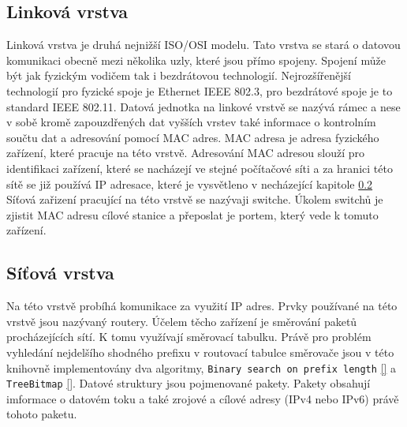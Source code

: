 \subsection{Linková vrstva}\label{layers:link}
Linková vrstva je druhá nejnižší ISO/OSI modelu. Tato vrstva se stará o datovou komunikaci
obecně mezi několika uzly, které jsou přímo spojeny. Spojení může být jak fyzickým vodičem tak i
bezdrátovou technologií. Nejrozšířenější technologií pro fyzické spoje je Ethernet IEEE 802.3, pro bezdrátové spoje
je to standard IEEE 802.11. Datová jednotka na linkové vrstvě se nazývá rámec a nese v sobě kromě
zapouzdřených dat vyšších vrstev také informace o kontrolním součtu dat a adresování pomocí MAC adres.
MAC adresa je adresa fyzického zařízení, které pracuje na této vrstvě.
Adresování MAC adresou slouží pro identifikaci zařízení, které se nacházejí ve stejné počítačové síti
a za hranici této sítě se již používá IP adresace, které je vysvětleno v necházející kapitole \ref{layers:network}
Síťová zařizení pracující na této vrstvě se nazývaji switche. Úkolem switchů je zjistit MAC adresu cílové stanice a přeposlat je portem, který vede k tomuto zařízení.

\subsection{Síťová vrstva}\label{layers:network}
Na této vrstvě probíhá komunikace za využití IP adres. Prvky používané na této vrstvě jsou nazývaný routery.
Účelem těcho zařízení je směrování paketů procházejících sítí. K tomu využívají směrovací tabulku.
Právě pro problém vyhledání nejdelšího shodného prefixu v routovací tabulce směrovače jsou v této knihovně
implementovány dva algoritmy, \texttt{Binary search on prefix length} \ref{} a \texttt{TreeBitmap} \ref{}.
Datové struktury jsou pojmenované pakety. Pakety obsahují imformace o datovém toku a také zrojové a cílové adresy (IPv4 nebo IPv6) právě tohoto paketu.

